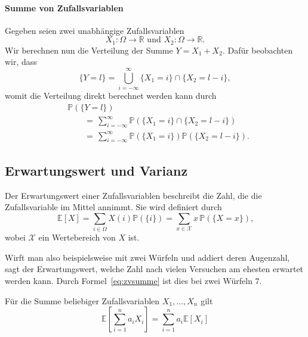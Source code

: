 \paragraph {Summe von Zufallsvariablen}
Gegeben seien zwei unabhängige Zufallsvariablen
\begin{equation*}
X_{1}:\Omega \rightarrow \mathbb{R} \text{ und }  X_{2}:\Omega \rightarrow \mathbb{R}.
\end{equation*}
Wir berechnen nun die Verteilung der Summe $Y=X_{1}+X_{2}$. Daf\"ur beobachten wir,  dass
\begin{equation*}
\{Y=l\}=\bigcup_{i=-\infty}^{\infty} \{X_{1}=i\} \cap \{X_{2}=l-i\},
\end{equation*}
womit die Verteilung direkt berechnet werden kann durch
\begin{align}
\label{eq:zvsumme}
&\mathbb{P} (\{Y=l\})\\
&\qquad=\, \sum_{i=-\infty}^{\infty} \mathbb{P} (\{X_{1}=i\} \cap \{X_{2}=l-i\})\nonumber\\
&\qquad=\, \sum_{i=-\infty}^{\infty} \mathbb{P} (\{X_{1} = i\})  \mathbb{P} (\{X_{2}=l-i\}) \nonumber. 
\end{align}


\subsection{Erwartungswert und Varianz}

\begin{Def}[Erwartungswert]
 Der Erwartungswert einer Zufallsvariablen beschreibt die Zahl, die die Zufallsvariable im Mittel annimmt. Sie wird definiert durch
\begin{equation*}
\mathbb{E} [X] = \sum_{i \in \Omega} X (i) \mathbb{P} (\{i\}) = \sum_{x\in\mathcal{X}} x \, \mathbb{P} (\{X=x\}) \text{,}
\end{equation*}
wobei $\mathcal{X}$ ein Wertebereich von $X$ ist.
\end{Def}

Wirft man also beispielsweise mit zwei W\"urfeln und addiert deren Augenzahl, sagt der Erwartungswert, welche Zahl nach vielen Versuchen am ehesten erwartet werden kann. Durch Formel~\eqref{eq:zvsumme} ist dies bei zwei W\"urfeln $7$.

\begin{Thm}
\label{thm:explinearity}
Für die Summe beliebiger Zufallsvariablen $X_{1}, \dots, X_{n}$ gilt
\begin{equation*}
\mathbb{E} \left[\sum_{i=1}^{n} a_{i} X_{i}\right] = \sum_{i=1}^{n} a_{i} \mathbb{E} [X_{i}] 
\end{equation*}
\end{Thm}

